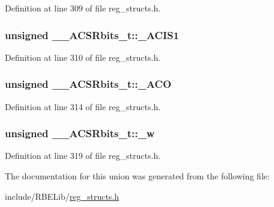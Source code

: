 Definition at line 309 of file reg\+\_\+structs.\+h.

\hypertarget{union_____a_c_s_rbits__t_aabfa7134749f9369d9d8e7b0e5e91d43}{
\subsubsection[{\+\_\+\+A\+C\+I\+S1}]{\setlength{\rightskip}{0pt plus 5cm}unsigned \+\_\+\+\_\+\+A\+C\+S\+Rbits\+\_\+t\+::\+\_\+\+A\+C\+I\+S1}}\label{union_____a_c_s_rbits__t_aabfa7134749f9369d9d8e7b0e5e91d43}


Definition at line 310 of file reg\+\_\+structs.\+h.

\hypertarget{union_____a_c_s_rbits__t_aebe03bd8fb652cdae9ce0a55e5fc10ff}{
\subsubsection[{\+\_\+\+A\+C\+O}]{\setlength{\rightskip}{0pt plus 5cm}unsigned \+\_\+\+\_\+\+A\+C\+S\+Rbits\+\_\+t\+::\+\_\+\+A\+C\+O}}\label{union_____a_c_s_rbits__t_aebe03bd8fb652cdae9ce0a55e5fc10ff}


Definition at line 314 of file reg\+\_\+structs.\+h.

\hypertarget{union_____a_c_s_rbits__t_a237f879730e09120645ed5574796d1b7}{
\subsubsection[{\+\_\+w}]{\setlength{\rightskip}{0pt plus 5cm}unsigned \+\_\+\+\_\+\+A\+C\+S\+Rbits\+\_\+t\+::\+\_\+w}}\label{union_____a_c_s_rbits__t_a237f879730e09120645ed5574796d1b7}


Definition at line 319 of file reg\+\_\+structs.\+h.



The documentation for this union was generated from the following file\+:\begin{DoxyCompactItemize}
\item 
include/\+R\+B\+E\+Lib/\hyperlink{reg__structs_8h}{reg\+\_\+structs.\+h}\end{DoxyCompactItemize}
